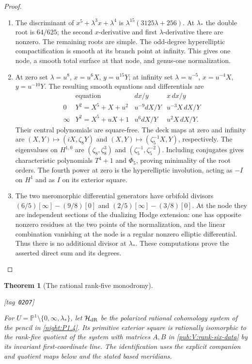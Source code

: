 \documentclass[11pt,a4paper]{article}
\numberwithin{equation}{section}
\newtheorem{theorem}{Theorem}[section]
\theoremstyle{definition}
\newcommand{\StatementRecord}[4]{{\upshape\footnotesize[tag~\texttt{#3}]}\enspace\ignorespaces}
\begin{document}
\begin{proof}
\begin{enumerate}[label=\arabic*.]
\item The discriminant of $x^5+\lambda^3x+\lambda^4$ is
$\lambda^{15}(3125\lambda+256)$.
At $\lambda_*$ the double root is $64/625$;
the second $x$-derivative and first $\lambda$-derivative there are
nonzero.  The remaining roots are simple.  The odd-degree
hyperelliptic compactification is smooth at its branch point at
infinity.  This gives one node, a smooth total surface at that node,
and genus-one normalization.

\item At zero set $\lambda=u^8$, $x=u^6X$, $y=u^{15}Y$; at infinity set
$\lambda=u^{-5}$, $x=u^{-4}X$, $y=u^{-10}Y$.
The resulting smooth equations and differentials are
\[
\begin{array}{c|c|c|c}
 &\text{equation}&dx/y&x\,dx/y\\\hline
0&Y^2=X^5+X+u^2&u^{-9}dX/Y&u^{-3}X\,dX/Y\\
\infty&Y^2=X^5+uX+1&u^6dX/Y&u^2X\,dX/Y.
\end{array}
\]
Their central polynomials are square-free.  The deck maps at zero and
infinity are $(X,Y)\mapsto(iX,\zeta_8Y)$ and
$(X,Y)\mapsto(\zeta_5^{-1}X,Y)$, respectively.
The eigenvalues on $H^{1,0}$ are $(\zeta_8,\zeta_8^3)$ and
$(\zeta_5^{-1},\zeta_5^{-2})$.  Including conjugates gives characteristic
polynomials $T^4+1$ and $\Phi_5$, proving minimality of the root orders.
The fourth power at zero is the hyperelliptic involution, acting as
$-I$ on $H^1$ and as $I$ on its exterior square.

\item The two meromorphic differential generators have orbifold divisors
$(6/5)[\infty]-(9/8)[0]$ and
$(2/5)[\infty]-(3/8)[0]$.
At the node they are independent sections of the dualizing Hodge
extension: one has opposite nonzero residues at the two points of the
normalization, and the linear combination vanishing at the node is a
regular nonzero elliptic differential.  Thus there is no additional
divisor at $\lambda_*$.  These computations prove the asserted direct
sum and its degrees.

\end{enumerate}
\end{proof}









\begin{theorem}[The rational rank-five monodromy]\hypertarget{tag-02O7}{}\label{maps:src:F.3.5}
\StatementRecord{maps:src:F.3.5}{proved}{02O7}{\cref{maps:src:F.2.5}}


For $U=\mathbb P^1\setminus\{0,\infty,\lambda_*\}$, let
$\mathcal H_{\rm dR}$ be the polarized rational cohomology system
of the pencil in \cref{night:P1.4}. Its primitive exterior square
is rationally isomorphic to the rank-five quotient of the system
with matrices $A,B$ in \cref{pub:V:rank-six-data} by its invariant
first-coordinate line. The identification uses the explicit
companion and quotient maps below and the stated based meridians.
\end{theorem}
\end{document}
